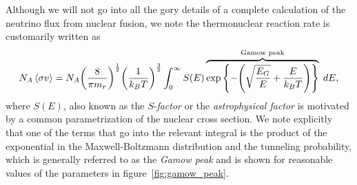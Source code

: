 Although we will not go into all the gory details of a complete calculation of the
neutrino flux from nuclear fusion, we note the thermonuclear reaction rate is
customarily written as
\begin{align}\label{eq:nusun_production_rate}
  N_A \left<\sigma v\right> =
  N_A \qty(\frac{8}{\pi m_r})^\frac{1}{2} \qty(\frac{1}{k_B T})^{\frac{3}{2}}
  \int_0^\infty S(E)
  \overbrace{\exp\qty{-\qty(\sqrt{\frac{E_G}{E}} + \frac{E}{\ensuremath{k_B}T})}}^\text{Gamow peak} \;d{E},
\end{align}
where $S(E)$, also known as the $S$-\emph{factor} or the \emph{astrophysical factor}
is motivated by a common parametrization of the nuclear cross section.
We note explicitly that one of the terms that go into the relevant integral is
the product of the exponential in the Maxwell-Boltzmann distribution and the tunneling
probability, which is generally referred to as the \emph{Gamow peak} and is shown
for reasonable values of the parameters in figure~\ref{fig:gamow_peak}.

\begin{marginfigure}
  
  \caption{Illustration of the Gamow peak for $E_G = 600$~keV and $\kB T = 1.5$~keV.
  The two dashed lines represent the two exponential terms in~\eqref{eq:nusun_production_rate},
  while the solid line is the product of the two, scaled by an arbitrary factor.}
  \label{fig:gamow_peak}
\end{marginfigure}

